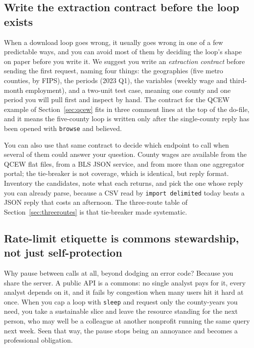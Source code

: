 \documentclass[
    a4paper,
    fontsize=10pt,
    twoside=true,
    numbers=noenddot,
]{kaobook}
\begin{document}
\subsection{Write the extraction contract before the loop exists}\label{ch03-sc-contract}
When a download loop goes wrong, it usually goes wrong in one of a few predictable ways, and you can avoid most of them by deciding the loop's shape on paper before you write it. We suggest you write an \emph{extraction contract} before sending the first request, naming four things: the geographies (five metro counties, by FIPS), the periods (2023 Q1), the variables (weekly wage and third-month employment), and a two-unit test case, meaning one county and one period you will pull first and inspect by hand. The contract for the QCEW example of Section~\ref{sec:qcew} fits in three comment lines at the top of the do-file, and it means the five-county loop is written only after the single-county reply has been opened with \texttt{browse} and believed.

You can also use that same contract to decide which endpoint to call when several of them could answer your question. County wages are available from the QCEW flat files, from a BLS JSON service, and from more than one aggregator portal; the tie-breaker is not coverage, which is identical, but reply format. Inventory the candidates, note what each returns, and pick the one whose reply you can already parse, because a CSV read by \texttt{import delimited} today beats a JSON reply that costs an afternoon. The three-route table of Section~\ref{sec:threeroutes} is that tie-breaker made systematic.

\subsection{Rate-limit etiquette is commons stewardship, not just self-protection}\label{ch03-commons}
Why pause between calls at all, beyond dodging an error code? Because you share the server. A public API is a commons: no single analyst pays for it, every analyst depends on it, and it fails by congestion when many users hit it hard at once. When you cap a loop with \texttt{sleep} and request only the county-years you need, you take a sustainable slice and leave the resource standing for the next person, who may well be a colleague at another nonprofit running the same query next week. Seen that way, the pause stops being an annoyance and becomes a professional obligation.
\end{document}
